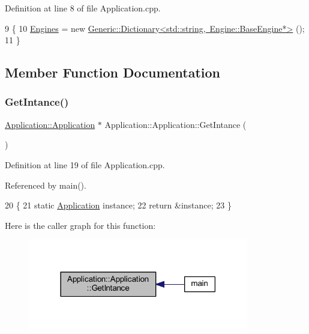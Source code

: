 Definition at line 8 of file Application.\+cpp.


\begin{DoxyCode}
9 \{
10     \mbox{\hyperlink{classApplication_1_1Application_a4f2808bddfc3f8fb2ed3a3fe0d4659ff}{Engines}} = \textcolor{keyword}{new} \mbox{\hyperlink{classGeneric_1_1Dictionary}{Generic::Dictionary<std::string, Engine::BaseEngine*>}}
      ();
11 \}
\end{DoxyCode}


\subsection{Member Function Documentation}
\mbox{\label{classApplication_1_1Application_ada268208f57ef136e006bb62fb30ffec}} 
\subsubsection{\texorpdfstring{Get\+Intance()}{GetIntance()}}
{\footnotesize\ttfamily \mbox{\hyperlink{classApplication_1_1Application}{Application\+::\+Application}} $\ast$ Application\+::\+Application\+::\+Get\+Intance (\begin{DoxyParamCaption}{ }\end{DoxyParamCaption})\hspace{0.3cm}{\ttfamily [static]}}



Definition at line 19 of file Application.\+cpp.



Referenced by main().


\begin{DoxyCode}
20 \{
21     \textcolor{keyword}{static} \mbox{\hyperlink{namespaceApplication}{Application}} instance;
22     \textcolor{keywordflow}{return} &instance;
23 \}
\end{DoxyCode}
Here is the caller graph for this function\+:
\nopagebreak
\begin{figure}[H]
\begin{center}
\leavevmode
\includegraphics[width=273pt]{classApplication_1_1Application_ada268208f57ef136e006bb62fb30ffec_icgraph}
\end{center}
\end{figure}
\mbox{\label{classApplication_1_1Application_a478f6946c4bf5361281681f2b58385c3}} 
